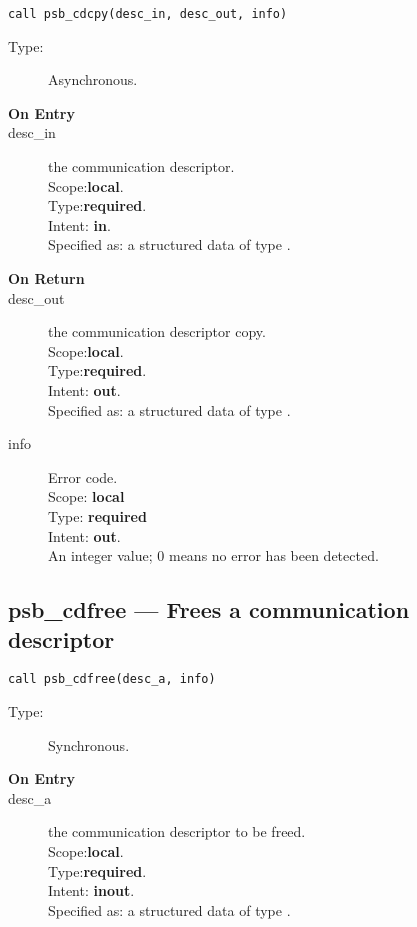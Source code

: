 \begin{verbatim}
call psb_cdcpy(desc_in, desc_out, info)
\end{verbatim}

\begin{description}
\item[Type:] Asynchronous.
\item[\bf On Entry]
\item[desc\_in] the communication descriptor.\\
Scope:{\bf local}.\\
Type:{\bf required}.\\
Intent: {\bf in}.\\
Specified as: a structured data of type \descdata.

\end{description}

\begin{description}
\item[\bf On Return]
\item[desc\_out] the communication descriptor copy.\\
Scope:{\bf local}.\\
Type:{\bf required}.\\
Intent: {\bf out}.\\
Specified as: a structured data of type \descdata.
\item[info] Error code.\\
Scope: {\bf local} \\
Type: {\bf required} \\
Intent: {\bf out}.\\
An integer value; 0 means no error has been detected. 
\end{description}


%
%
\clearpage\subsection*{psb\_cdfree --- Frees a communication descriptor}

\begin{verbatim}
call psb_cdfree(desc_a, info)
\end{verbatim}

\begin{description}
\item[Type:] Synchronous.
\item[\bf On Entry]
\item[desc\_a] the communication descriptor to be freed.\\
Scope:{\bf local}.\\
Type:{\bf required}.\\
Intent: {\bf inout}.\\
Specified as: a structured data of type \descdata.
\end{description}

